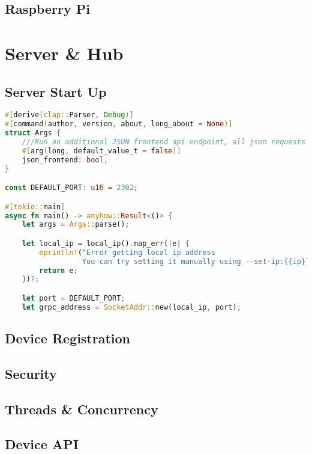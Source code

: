 \subsection{Raspberry Pi} \label{sec:chap3:technology:raspi}


\section{Server \& Hub} \label{sec:chap3:server}
\subsection{Server Start Up} \label{sec:chap3:server:startup}
\begin{lstlisting}[language=Rust, style=boxed, showstringspaces=false]
#[derive(clap::Parser, Debug)]
#[command(author, version, about, long_about = None)]
struct Args {
    ///Run an additional JSON frontend api endpoint, all json requests get routed to main GRPC
    #[arg(long, default_value_t = false)]
    json_frontend: bool,
}

const DEFAULT_PORT: u16 = 2302;

#[tokio::main]
async fn main() -> anyhow::Result<()> {
    let args = Args::parse();

    let local_ip = local_ip().map_err(|e| {
        eprintln!("Error getting local ip address
                  You can try setting it manually using --set-ip:{{ip}}"); 
        return e;
    })?;

    let port = DEFAULT_PORT;
    let grpc_address = SocketAddr::new(local_ip, port);
\end{lstlisting}
\subsection{Device Registration} \label{sec:chap3:server:registration}


\subsection{Security} \label{sec:chap3:server:security}

\subsection{Threads \& Concurrency} \label{sec:chap3:server:threads}

\subsection{Device API} \label{sec:chap3:server:api}

